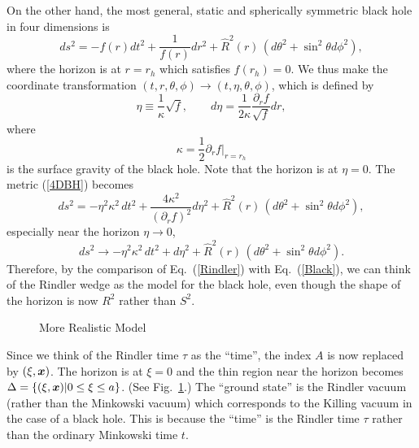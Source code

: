 \documentclass[12pt,epsf]{article}
\def\bmi#1{\mbox{\boldmath $#1$}}
\begin{document}
On the other hand,
the most general, static and spherically symmetric black hole
in four dimensions is
\begin{equation}
ds^2=-f(r)dt^2+\frac{1}{f(r)}dr^2+
\hat{R}^2(r)\,(d\theta^2+\sin^2\theta d\phi^2),
\label{4DBH}
\end{equation}
where the horizon is at $r=r_h$ which satisfies $f(r_h)=0$.
We thus make the coordinate transformation
$(t,r,\theta,\phi)\to(t,\eta,\theta,\phi)$,
which is defined by
\begin{equation}
\eta\equiv\frac{1}{\kappa}\sqrt{f},\qquad
    d\eta=\frac{1}{2\kappa}\frac{\partial_r f}{\sqrt{f}} dr,
\end{equation}
where 
\begin{equation}
\kappa=\frac{1}{2}\partial_r f|_{r=r_h}
\end{equation}
is the surface gravity of the black hole.
Note that the horizon is at $\eta=0$.
The metric (\ref{4DBH}) becomes
\begin{equation}
 ds^2=-\eta^2\kappa^2\, dt^2+\frac{4\kappa^2}{(\partial_r f)^2}d\eta^2
   +\hat{R}^2(r)\,(d\theta^2+\sin^2\theta d\phi^2),
\end{equation}
especially near the horizon $\eta\to0$,
\begin{equation}
 ds^2\to-\eta^2\kappa^2\, dt^2+d\eta^2
   +\hat{R}^2(r)\,(d\theta^2+\sin^2\theta d\phi^2).
\label{Black}
\end{equation}
Therefore, by the comparison of Eq.~(\ref{Rindler})
with Eq.~(\ref{Black}),
we can think of the Rindler wedge as the model for
the black hole, even though the shape of the horizon
is now $R^2$ rather than $S^2$.

\begin{figure}
\begin{center}
\leavevmode
\epsfysize=7cm
\caption{More Realistic Model}
\label{model2}
\end{center}
\end{figure}

Since we think of the Rindler time $\tau$ as the ``time'',
the index $A$ is now replaced by $(\xi,\bmi{x})$.
The horizon is at $\xi=0$ and 
the thin region near the horizon becomes
$\Delta=\{(\xi,\bmi{x}) | 0\le \xi \le a \}$.
(See Fig.~\ref{model2}.)
The ``ground state'' is the Rindler vacuum
(rather than the Minkowski vacuum)
which corresponds to the Killing vacuum
in the case of a black hole.
This is because the ``time'' is the Rindler time $\tau$
rather than the ordinary Minkowski time $t$.
\end{document}
